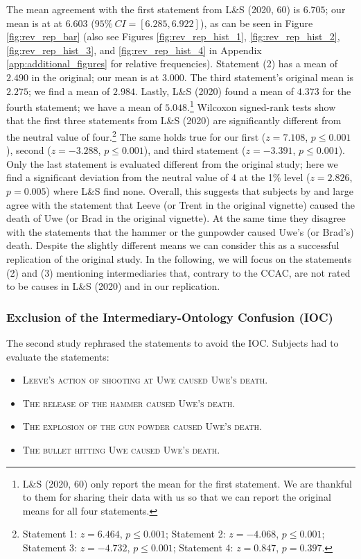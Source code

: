 \documentclass[egregdoesnotlikesansseriftitles,12pt]{scrartcl}
\begin{document}
\noindent The mean agreement with the first statement from L\&S (2020, 60) is $6.705$; our mean is at at $6.603$ ($95\%~CI=[6.285,6.922]$), as can be seen in Figure \ref{fig:rev_rep_bar} (also see Figures \ref{fig:rev_rep_hist_1}, \ref{fig:rev_rep_hist_2}, \ref{fig:rev_rep_hist_3}, and \ref{fig:rev_rep_hist_4} in Appendix \ref{app:additional_figures} for relative frequencies). Statement (2) has a mean of $2.490$ in the original; our mean is at $3.000$. The third statement's original mean is $2.275$; we find a mean of $2.984$. Lastly, L\&S (2020) found a mean of $4.373$ for the fourth statement; we have a mean of $5.048$.\footnote{L\&S (2020, 60) only report the mean for the first statement. We are thankful to them for sharing their data with us so that we can report the original means for all four statements.} Wilcoxon signed-rank tests show that the first three statements from L\&S (2020) are significantly different from the neutral value of four.\footnote{Statement 1: $z=6.464$, $p \leq 0.001$; Statement 2: $z=-4.068$, $p \leq 0.001$; Statement 3: $z=-4.732$, $p \leq 0.001$; Statement 4: $z= 0.847$, $p=0.397$.} The same holds true for our first ($z=7.108$, $p \leq 0.001$), second ($z=-3.288$, $p \leq 0.001$), and third statement ($z=-3.391$, $p \leq 0.001$). Only the last statement is evaluated different from the original study; here we find a significant deviation from the neutral value of 4 at the 1\% level ($z=2.826$, $p=0.005$) where L\&S find none. Overall, this suggests that subjects by and large agree with the statement that Leeve (or Trent in the original vignette) caused the death of Uwe (or Brad in the original vignette). At the same time they disagree with the statements that the hammer or the gunpowder caused Uwe's (or Brad's) death. Despite the slightly different means we can consider this as a successful replication of the original study. In the following, we will focus on the statements (2) and (3) mentioning intermediaries that, contrary to the CCAC, are not rated to be causes in L\&S (2020) and in our replication.

\subsubsection{Exclusion of the Intermediary-Ontology Confusion (IOC)}\label{sec:results_rev_ioc}
The second study rephrased the statements to avoid the IOC. Subjects had to evaluate the statements:

\begin{itemize}
   \item[(1)]\textsc{Leeve's action of shooting at Uwe caused Uwe's death.}
   \item[(2)]\textsc{The release of the hammer caused Uwe's death.}
   \item[(3)]\textsc{The explosion of the gun powder caused Uwe's death.}
   \item[(4)]\textsc{The bullet hitting Uwe caused Uwe's death.}
\end{itemize}
\end{document}
